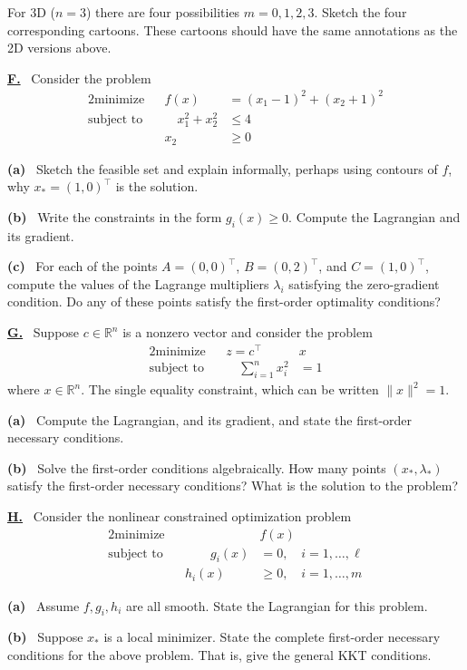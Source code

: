 \documentclass[11pt]{amsart}
\newcommand{\RR}{{\mathbb{R}}}
\newcommand{\prob}[1]{\bigskip\noindent\large\textbf{\underline{#1.}} \, \normalsize}
\newcommand{\epart}[1]{\medskip\noindent \textbf{(#1)} \,}
\begin{document}
\bigskip
\noindent For 3D ($n=3$) there are four possibilities $m=0,1,2,3$.  Sketch the four corresponding cartoons.  These cartoons should have the same annotations as the 2D versions above.


\prob{F}  Consider the problem
\begin{alignat*}{2}
    \text{minimize}   &&  f(x) &= (x_1-1)^2 + (x_2+1)^2 \\
    \text{subject to} && \quad x_1^2 + x_2^2 &\le 4 \\
                      &&        x_2 &\ge 0
\end{alignat*}

\epart{a}  Sketch the feasible set and explain informally, perhaps using contours of $f$, why $x_*=(1,0)^\top$ is the solution.

\epart{b}  Write the constraints in the form $g_i(x)\ge 0$.  Compute the Lagrangian and its gradient.

\epart{c}  For each of the points $A = (0,0)^\top$, $B=(0,2)^\top$, and $C=(1,0)^\top$, compute the values of the Lagrange multipliers $\lambda_i$ satisfying the zero-gradient condition.  Do any of these points satisfy the first-order optimality conditions?


\prob{G}  Suppose $c\in\RR^n$ is a nonzero vector and consider the problem
\begin{alignat*}{2}
    \text{minimize}   &&  z = c^\top &x \\
    \text{subject to} && \quad \sum_{i=1}^n x_i^2 &= 1
\end{alignat*}
where $x\in\RR^n$.  The single equality constraint, which can be written $\|x\|^2=1$.

\epart{a}  Compute the Lagrangian, and its gradient, and state the first-order necessary conditions.

\epart{b}  Solve the first-order conditions algebraically.  How many points $(x_*,\lambda_*)$ satisfy the first-order necessary conditions?  What is the solution to the problem?


\prob{H}  Consider the nonlinear constrained optimization problem
\begin{alignat*}{2}
    \text{minimize}   &&  &f(x) \\
    \text{subject to} && \qquad g_i(x) &= 0, \quad i=1,\dots,\ell \\
                      &&       h_i(x) &\ge 0, \quad i=1,\dots,m
\end{alignat*}

\epart{a}  Assume $f,g_i,h_i$ are all smooth.  State the Lagrangian for this problem.

\epart{b}  Suppose $x_*$ is a local minimizer.  State the complete first-order necessary conditions for the above problem.  That is, give the general KKT conditions.
\end{document}

